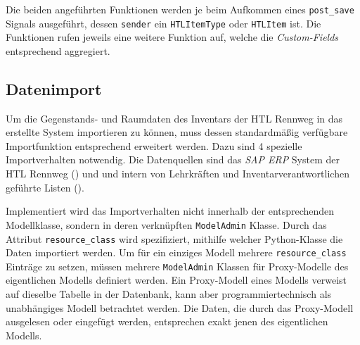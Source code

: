 Die beiden angeführten Funktionen werden je beim Aufkommen eines
\texttt{post\_save} Signals \cite{django-doku-signals} ausgeführt,
dessen \texttt{sender} ein \texttt{HTLItemType} oder \texttt{HTLItem}
ist. Die Funktionen rufen jeweils eine weitere Funktion auf, welche die
\emph{Custom-Fields} entsprechend aggregiert.

\hypertarget{datenimport}{%
\subsection{Datenimport}\label{datenimport}}

Um die Gegenstands- und Raumdaten des Inventars der HTL Rennweg in das
erstellte System importieren zu können, muss dessen standardmäßig
verfügbare Importfunktion entsprechend erweitert werden. Dazu sind 4
spezielle Importverhalten notwendig. Die Datenquellen sind das
\emph{SAP ERP}
System der HTL Rennweg () und und
intern von Lehrkräften und Inventarverantwortlichen geführte Listen
().

Implementiert wird das Importverhalten nicht innerhalb der
entsprechenden Modellklasse, sondern in deren verknüpften
\texttt{ModelAdmin} Klasse. Durch das Attribut \texttt{resource\_class}
wird spezifiziert, mithilfe welcher Python-Klasse die Daten importiert
werden. Um für ein einziges Modell mehrere \texttt{resource\_class}
Einträge zu setzen, müssen mehrere \texttt{ModelAdmin} Klassen für
Proxy-Modelle \cite{django-doku-models} des eigentlichen Modells
definiert werden. Ein Proxy-Modell eines Modells verweist auf dieselbe
Tabelle in der Datenbank, kann aber programmiertechnisch als
unabhängiges Modell betrachtet werden. Die Daten, die durch das
Proxy-Modell ausgelesen oder eingefügt werden, entsprechen exakt jenen
des eigentlichen Modells.

\begin{Shaded}
\begin{Highlighting}[]
\OperatorTok{=} 

\NormalTok{())}
\NormalTok{())}

\OperatorTok{=}
\end{Highlighting}
\end{Shaded}

